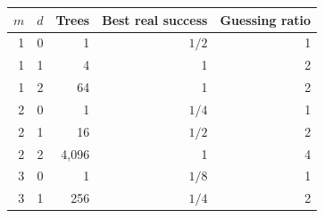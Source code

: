 \begin{tabular}{rrrrr}
\toprule
$m$ & $d$ & Trees & Best real success & Guessing ratio \\
\midrule
1 & 0 & 1 & $1/2$ & 1 \\
1 & 1 & 4 & 1 & 2 \\
1 & 2 & 64 & 1 & 2 \\
2 & 0 & 1 & $1/4$ & 1 \\
2 & 1 & 16 & $1/2$ & 2 \\
2 & 2 & 4,096 & 1 & 4 \\
3 & 0 & 1 & $1/8$ & 1 \\
3 & 1 & 256 & $1/4$ & 2 \\
\bottomrule
\end{tabular}
